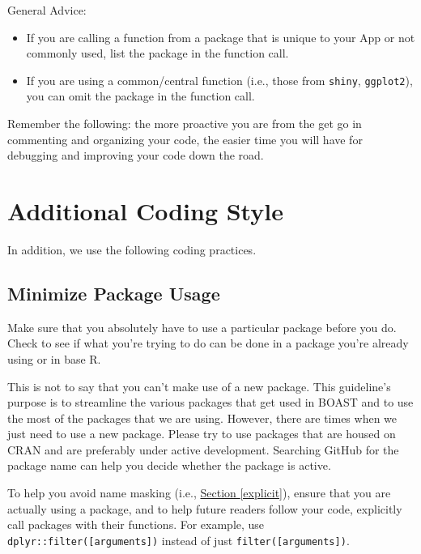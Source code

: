\documentclass[
]{book}
\providecommand{\tightlist}{%
  \setlength{\itemsep}{0pt}\setlength{\parskip}{0pt}}
\begin{document}
General Advice:

\begin{itemize}
\tightlist
\item
  If you are calling a function from a package that is unique to your App or not commonly used, list the package in the function call.
\item
  If you are using a common/central function (i.e., those from \texttt{shiny}, \texttt{ggplot2}), you can omit the package in the function call.
\end{itemize}

Remember the following: the more proactive you are from the get go in commenting and organizing your code, the easier time you will have for debugging and improving your code down the road.

\hypertarget{additional-coding-style-1}{%
\section{Additional Coding Style}\label{additional-coding-style-1}}

In addition, we use the following coding practices.

\hypertarget{minPackagesb}{%
\subsection{Minimize Package Usage}\label{minPackagesb}}

Make sure that you absolutely have to use a particular package before you do. Check to see if what you're trying to do can be done in a package you're already using or in base R.

This is not to say that you can't make use of a new package. This guideline's purpose is to streamline the various packages that get used in BOAST and to use the most of the packages that we are using. However, there are times when we just need to use a new package. Please try to use packages that are housed on CRAN and are preferably under active development. Searching GitHub for the package name can help you decide whether the package is active.

To help you avoid name masking (i.e., \protect\hyperlink{explicit}{Section \ref{explicit}}), ensure that you are actually using a package, and to help future readers follow your code, explicitly call packages with their functions. For example, use \texttt{dplyr::filter({[}arguments{]})} instead of just \texttt{filter({[}arguments{]})}.
\end{document}
